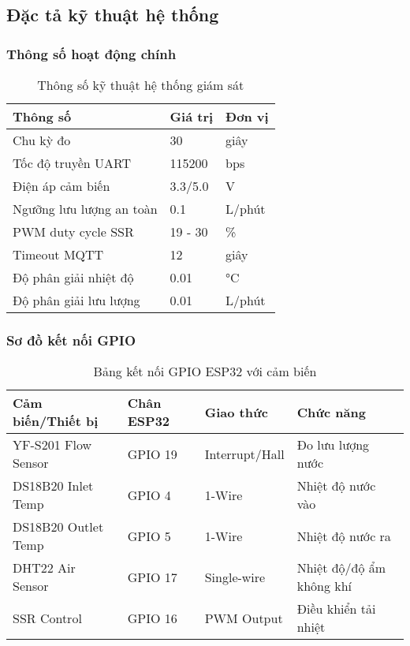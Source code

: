 \documentclass[../main.tex]{subfiles}
\begin{document}


\subsection{Đặc tả kỹ thuật hệ thống}
\label{sec:system_specifications}

\subsubsection{Thông số hoạt động chính}
\label{sec:operational_parameters}

\begin{table}[H]
\centering
\caption{Thông số kỹ thuật hệ thống giám sát}
\renewcommand{\arraystretch}{1.5}
\begin{tabular}{|l|l|l|}
\hline
\textbf{Thông số} & \textbf{Giá trị} & \textbf{Đơn vị} \\
\hline
Chu kỳ đo & 30 & giây \\
Tốc độ truyền UART & 115200 & bps \\
Điện áp cảm biến & 3.3/5.0 & V \\
Ngưỡng lưu lượng an toàn & 0.1 & L/phút \\
PWM duty cycle SSR & 19 - 30 & \% \\
Timeout MQTT & 12 & giây \\
Độ phân giải nhiệt độ & 0.01 & °C \\
Độ phân giải lưu lượng & 0.01 & L/phút \\
\hline
\end{tabular}
\end{table}

\subsubsection{Sơ đồ kết nối GPIO}

\begin{table}[H]
\centering
\caption{Bảng kết nối GPIO ESP32 với cảm biến}
\renewcommand{\arraystretch}{1.5}
\begin{tabular}{|l|l|l|l|}
\hline
\textbf{Cảm biến/Thiết bị} & \textbf{Chân ESP32} & \textbf{Giao thức} & \textbf{Chức năng} \\
\hline
YF-S201 Flow Sensor & GPIO 19 & Interrupt/Hall & Đo lưu lượng nước \\
DS18B20 Inlet Temp & GPIO 4 & 1-Wire & Nhiệt độ nước vào \\
DS18B20 Outlet Temp & GPIO 5 & 1-Wire & Nhiệt độ nước ra \\
DHT22 Air Sensor & GPIO 17 & Single-wire & Nhiệt độ/độ ẩm không khí \\
SSR Control & GPIO 16 & PWM Output & Điều khiển tải nhiệt \\
\hline
\end{tabular}
\end{table}
\end{document}

